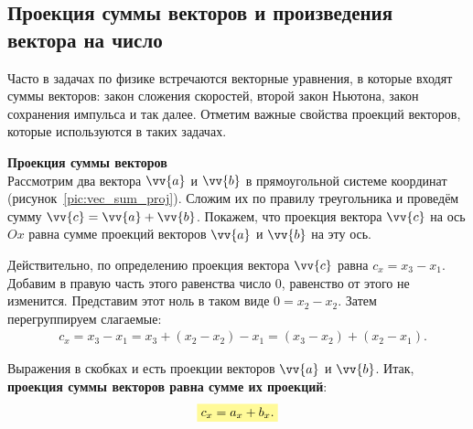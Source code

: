 \clearpage

\subsection{Проекция суммы векторов и произведения вектора на число}

Часто в задачах по физике встречаются векторные уравнения, в которые
входят суммы векторов: закон сложения скоростей, второй закон Ньютона,
закон сохранения импульса и так далее. Отметим важные свойства проекций
векторов, которые используются в таких задачах.

\textbf{Проекция суммы векторов}\\
Рассмотрим два вектора $\vv{a}$ и $\vv{b}$ в прямоугольной системе координат
(рисунок~\ref{pic:vec_sum_proj}). Сложим их по правилу треугольника и проведём
сумму $\vv{c} = \vv{a}+\vv{b}$. Покажем, что проекция вектора $\vv{c}$ на ось $Ox$
равна сумме проекций векторов $\vv{a}$ и $\vv{b}$ на эту ось.

Действительно, по определению проекция вектора $\vv{c}$ равна $c_x = x_3 - x_1$. Добавим
в правую часть этого равенства число 0, равенство от этого не изменится. Представим этот ноль
в таком виде $0 = x_2 - x_2$. Затем перегруппируем слагаемые:
\begin{align}
&c_x = x_3 - x_1 = x_3 + (x_2 - x_2) - x_1 = (x_3 - x_2) + (x_2 - x_1).
\end{align}

Выражения в скобках и есть проекции векторов $\vv{a}$ и $\vv{b}$. Итак,
\textbf{проекция суммы векторов равна сумме их проекций}:
{\large
\begin{align}
  \hly{c_x = a_x + b_x.}
\end{align}
}

